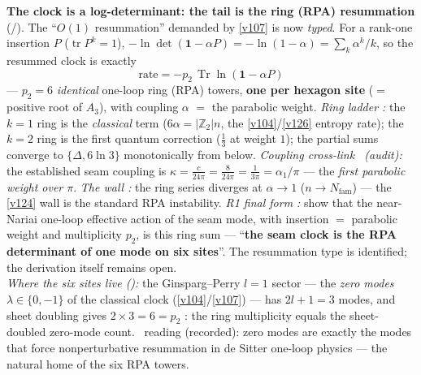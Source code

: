 \documentclass[11pt,a4paper]{article}
\newcommand{\Z}{\mathbb{Z}}
\newcommand{\Nfam}{N_{\mathrm{fam}}}
\begin{document}
\par\smallskip\noindent\textbf{The clock is a log-determinant: the tail is the ring (RPA) resummation} (\mE/\mC).
The ``$O(1)$ resummation'' demanded by \vref{v107} is now \emph{typed}. For a rank-one insertion $P$
($\operatorname{tr}P^k=1$), $-\ln\det(\mathbf1-\alpha P)=-\ln(1-\alpha)=\sum_k\alpha^k/k$, so the
resummed clock is exactly
\[
  \boxed{\ \mathrm{rate}=-p_2\,\operatorname{Tr}\ln(\mathbf1-\alpha P)\ }
\]
--- $p_2=6$ \emph{identical} one-loop ring (RPA) towers, \textbf{one per hexagon site} ($=$ positive
root of $A_3$), with coupling $\alpha$ $=$ the parabolic weight. \emph{Ring ladder \mE:} the $k{=}1$
ring is the \emph{classical} term ($6\alpha=|\Z_2|n$, the \vref{v104}/\vref{v126} entropy rate); the $k{=}2$ ring is
the first quantum correction ($\tfrac13$ at weight $1$); the partial sums converge to
$\{\Delta,6\ln3\}$ monotonically from below. \emph{Coupling cross-link \mE\ (audit):} the established
seam coupling is $\kappa=\tfrac c{24\pi}=\tfrac8{24\pi}=\tfrac1{3\pi}=\alpha_1/\pi$ --- the
\emph{first parabolic weight over $\pi$}. \emph{The wall \mE:} the ring series diverges at
$\alpha\to1$ ($n\to\Nfam$) --- the \vref{v124} wall is the standard RPA instability. \emph{R1 final form
\mC:} show that the near-Nariai one-loop effective action of the seam mode, with insertion $=$
parabolic weight and multiplicity $p_2$, is this ring sum --- ``\textbf{the seam clock is the RPA
determinant of one mode on six sites}''. The resummation type is identified; the derivation itself
remains open.
\smallskip\\
\noindent\emph{Where the six sites live ():} the Ginsparg--Perry $l=1$
sector --- the \emph{zero modes} $\lambda\in\{0,-1\}$ of the classical clock (\vref{v104}/\vref{v107}) --- has
$2l+1=3$ modes, and sheet doubling gives $2\times3=6=p_2$ \mE: the ring multiplicity equals the
sheet-doubled zero-mode count. \mC\ reading (recorded): zero modes are exactly the modes that force
nonperturbative resummation in de Sitter one-loop physics --- the natural home of the six RPA towers. 
\end{document}
